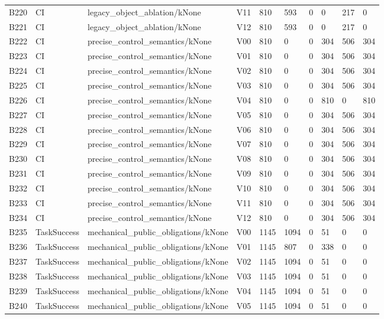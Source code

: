 \begin{longtable}{llllllllll}
B220 & CI & legacy\_object\_ablation/kNone & V11 & 810 & 593 & 0 & 0 & 217 & 0 \\
B221 & CI & legacy\_object\_ablation/kNone & V12 & 810 & 593 & 0 & 0 & 217 & 0 \\
B222 & CI & precise\_control\_semantics/kNone & V00 & 810 & 0 & 0 & 304 & 506 & 304 \\
B223 & CI & precise\_control\_semantics/kNone & V01 & 810 & 0 & 0 & 304 & 506 & 304 \\
B224 & CI & precise\_control\_semantics/kNone & V02 & 810 & 0 & 0 & 304 & 506 & 304 \\
B225 & CI & precise\_control\_semantics/kNone & V03 & 810 & 0 & 0 & 304 & 506 & 304 \\
B226 & CI & precise\_control\_semantics/kNone & V04 & 810 & 0 & 0 & 810 & 0 & 810 \\
B227 & CI & precise\_control\_semantics/kNone & V05 & 810 & 0 & 0 & 304 & 506 & 304 \\
B228 & CI & precise\_control\_semantics/kNone & V06 & 810 & 0 & 0 & 304 & 506 & 304 \\
B229 & CI & precise\_control\_semantics/kNone & V07 & 810 & 0 & 0 & 304 & 506 & 304 \\
B230 & CI & precise\_control\_semantics/kNone & V08 & 810 & 0 & 0 & 304 & 506 & 304 \\
B231 & CI & precise\_control\_semantics/kNone & V09 & 810 & 0 & 0 & 304 & 506 & 304 \\
B232 & CI & precise\_control\_semantics/kNone & V10 & 810 & 0 & 0 & 304 & 506 & 304 \\
B233 & CI & precise\_control\_semantics/kNone & V11 & 810 & 0 & 0 & 304 & 506 & 304 \\
B234 & CI & precise\_control\_semantics/kNone & V12 & 810 & 0 & 0 & 304 & 506 & 304 \\
B235 & TaskSuccess & mechanical\_public\_obligations/kNone & V00 & 1145 & 1094 & 0 & 51 & 0 & 0 \\
B236 & TaskSuccess & mechanical\_public\_obligations/kNone & V01 & 1145 & 807 & 0 & 338 & 0 & 0 \\
B237 & TaskSuccess & mechanical\_public\_obligations/kNone & V02 & 1145 & 1094 & 0 & 51 & 0 & 0 \\
B238 & TaskSuccess & mechanical\_public\_obligations/kNone & V03 & 1145 & 1094 & 0 & 51 & 0 & 0 \\
B239 & TaskSuccess & mechanical\_public\_obligations/kNone & V04 & 1145 & 1094 & 0 & 51 & 0 & 0 \\
B240 & TaskSuccess & mechanical\_public\_obligations/kNone & V05 & 1145 & 1094 & 0 & 51 & 0 & 0 \\

\end{longtable}
